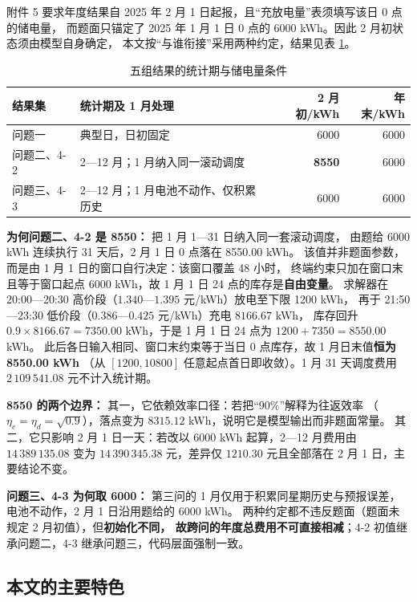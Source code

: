 附件 5 要求年度结果自 2025 年 2 月 1 日起报，且“充放电量”表须填写该日 0 点的储电量，
而题面只锚定了 2025 年 1 月 1 日 0 点的 6000 kWh。因此 2 月初状态须由模型自身确定，
本文按“与谁衔接”采用两种约定，结果见表 \ref{tab:statperiod}。

\begin{table}[H]
\centering
\caption{五组结果的统计期与储电量条件}
\label{tab:statperiod}
\small
\begin{tabularx}{\textwidth}{@{}l X r r@{}}
\toprule
结果集 & 统计期及 1 月处理 & {2 月初/kWh} & {年末/kWh} \\
\midrule
问题一     & 典型日，日初固定         & 6000 & 6000 \\
问题二、4-2 & 2—12 月；1 月纳入同一滚动调度 & \textbf{8550} & 6000 \\
问题三、4-3 & 2—12 月；1 月电池不动作、仅积累历史 & 6000 & 6000 \\
\bottomrule
\end{tabularx}
\end{table}

\textbf{为何问题二、4-2 是 8550：} 把 1 月 1—31 日纳入同一套滚动调度，
由题给 6000 kWh 连续执行 31 天后，2 月 1 日 0 点落在 8550.00 kWh。
该值并非题面参数，而是由 1 月 1 日的窗口自行决定：该窗口覆盖 48 小时，
终端约束只加在窗口末且等于窗口起点 6000 kWh，故 1 月 1 日 24 点的库存是\textbf{自由变量}。
求解器在 20:00—20:30 高价段（$1.340$—$1.395$ 元/kWh）放电至下限 1200 kWh，
再于 21:50—23:30 低价段（$0.386$—$0.425$ 元/kWh）充电 $8166.67$ kWh，
库存回升 $0.9\times8166.67=7350.00$ kWh，于是 1 月 1 日 24 点为 $1200+7350=\mathbf{8550.00}$ kWh。
此后各日输入相同、窗口末约束等于当日 0 点库存，故 1 月日末值\textbf{恒为 8550.00 kWh}
（从 $[1200,10800]$ 任意起点首日即收敛）。1 月 31 天调度费用 $2\,109\,541.08$ 元不计入统计期。

\textbf{8550 的两个边界：} 其一，它依赖效率口径：若把“$90\%$”解释为往返效率
（$\eta_c=\eta_d=\sqrt{0.9}$），落点变为 $8315.12$ kWh，说明它是模型输出而非题面常量。
其二，它只影响 2 月 1 日一天：若改以 6000 kWh 起算，2—12 月费用由 $14\,389\,135.08$
变为 $14\,390\,345.38$ 元，差异仅 $1210.30$ 元且全部落在 2 月 1 日，主要结论不变。

\textbf{问题三、4-3 为何取 6000：} 第三问的 1 月仅用于积累同星期历史与预报误差，
电池不动作，2 月 1 日沿用题给的 6000 kWh。
两种约定都不违反题面（题面未规定 2 月初值），但\textbf{初始化不同，
故跨问的年度总费用不可直接相减}；4-2 初值继承问题二，4-3 继承问题三，代码层面强制一致。


\subsection{本文的主要特色}

